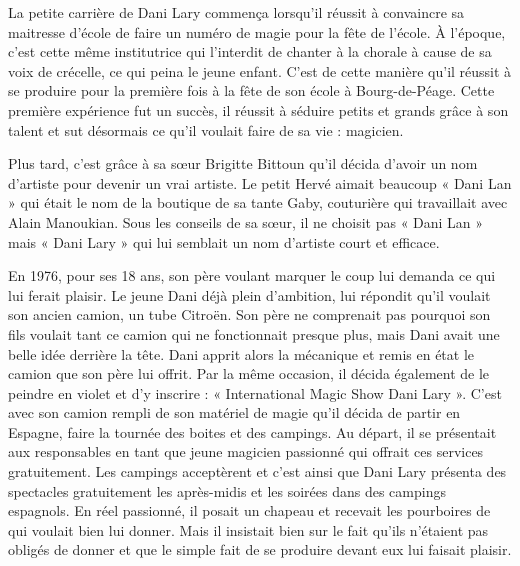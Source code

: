 La petite carrière de Dani Lary commença lorsqu’il réussit à convaincre sa maitresse d’école de faire un numéro de magie pour la fête de l’école. À l’époque, c’est cette même institutrice qui l’interdit de chanter à la chorale à cause de sa voix de crécelle, ce qui peina le jeune enfant. C’est de cette manière qu’il réussit à se produire pour la première fois à la fête de son école à Bourg-de-Péage. Cette première expérience fut un succès, il réussit à séduire petits et grands grâce à son talent et sut désormais ce qu'il voulait faire de sa vie : magicien.  

Plus tard, c'est grâce à sa sœur Brigitte Bittoun qu’il décida d’avoir un nom d’artiste pour devenir un vrai artiste. Le petit Hervé aimait beaucoup « Dani Lan » qui était le nom de la boutique de sa tante Gaby, couturière qui travaillait avec Alain Manoukian. Sous les conseils de sa sœur, il ne choisit pas « Dani Lan » mais « Dani Lary » qui lui semblait un nom d’artiste court et efficace. 

En 1976, pour ses 18 ans, son père voulant marquer le coup lui demanda ce qui lui ferait plaisir. Le jeune Dani déjà plein d’ambition, lui répondit qu’il voulait son ancien camion, un tube Citroën. Son père ne comprenait pas pourquoi son fils voulait tant ce camion qui ne fonctionnait presque plus, mais Dani avait une belle idée derrière la tête. Dani apprit alors la mécanique et remis en état le camion que son père lui offrit. Par la même occasion, il décida également de le peindre en violet et d’y inscrire : « International Magic Show Dani Lary ». C’est avec son camion rempli de son matériel de magie qu’il décida de partir en Espagne, faire la tournée des boites et des campings. Au départ, il se présentait aux responsables en tant que jeune magicien passionné qui offrait ces services gratuitement. Les campings acceptèrent et c’est ainsi que Dani Lary présenta des spectacles gratuitement les après-midis et les soirées dans des campings espagnols. En réel passionné, il posait un chapeau et recevait les pourboires de qui voulait bien lui donner. Mais il insistait bien sur le fait qu’ils n’étaient pas obligés de donner et que le simple fait de se produire devant eux lui faisait plaisir. 

